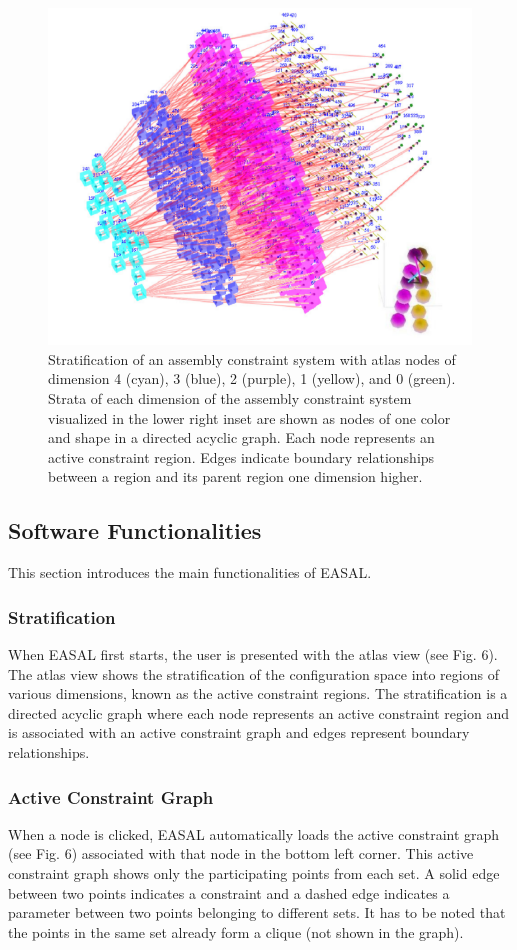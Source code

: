 \documentclass[10pt]{article}
\begin{document}
\begin{figure}
\begin{center}
\includegraphics[width=.6\linewidth]{fig/Stratification.png}
\end{center}
\caption{Stratification of an assembly constraint system with atlas nodes of
    dimension 4 (cyan), 3 (blue), 2 (purple), 1 (yellow), and 0 (green). Strata of
	each dimension of the assembly constraint system visualized in the
	lower right inset are shown as nodes of one color and shape in a
	directed acyclic graph. Each node represents an active constraint
region. Edges indicate boundary relationships between a region and its parent region one dimension higher.}
\label{atlas}
\end{figure}


\subsection{Software Functionalities}


This section introduces the main functionalities of EASAL.


\subsubsection{Stratification}
When EASAL first starts, the user is presented with the atlas view (see Fig. 6).
The atlas view shows the
stratification of the configuration space into regions of various dimensions, known as the active constraint
regions. The stratification is a directed acyclic graph where each node represents an active constraint region
and is associated with an active constraint graph and edges represent boundary relationships.

\subsubsection{Active Constraint Graph}
When a node is clicked, EASAL automatically loads the active constraint graph (see Fig. 6) associated with
that node in the bottom left corner. This active constraint graph shows only the participating points from
each set. A solid edge between two points indicates a constraint and a dashed edge indicates a parameter
between two points belonging to different sets. It has to be noted that the points in the same set already
form a clique (not shown in the graph).
\end{document}
